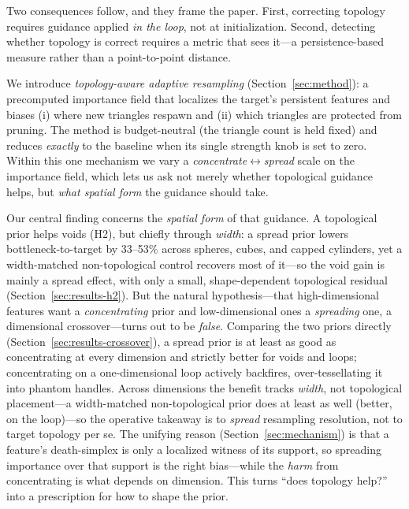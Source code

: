 Two consequences follow, and they frame the paper. First, correcting topology
requires guidance applied \emph{in the loop}, not at initialization. Second,
detecting whether topology is correct requires a metric that sees it---a
persistence-based measure rather than a point-to-point distance.

We introduce \emph{topology-aware adaptive resampling}
(Section~\ref{sec:method}): a precomputed importance field that localizes the
target's persistent features and biases (i) where new triangles respawn and
(ii) which triangles are protected from pruning. The method is budget-neutral
(the triangle count is held fixed) and reduces \emph{exactly} to the baseline
when its single strength knob is set to zero. Within this one mechanism we vary a
\emph{concentrate$\leftrightarrow$spread} scale on the importance field, which
lets us ask not merely whether topological guidance helps, but \emph{what spatial
form} the guidance should take.

Our central finding concerns the \emph{spatial form} of that guidance. A
topological prior helps voids (H2), but chiefly through \emph{width}: a spread prior
lowers bottleneck-to-target by 33--53\% across spheres, cubes, and capped cylinders,
yet a width-matched non-topological control recovers most of it---so the void gain is
mainly a spread effect, with only a small, shape-dependent topological residual
(Section~\ref{sec:results-h2}).
But the natural hypothesis---that high-dimensional features want a
\emph{concentrating} prior and low-dimensional ones a \emph{spreading} one, a
dimensional crossover---turns out to be \emph{false}. Comparing the two priors
directly (Section~\ref{sec:results-crossover}), a spread prior is at least as good
as concentrating at every dimension and strictly better for voids and loops;
concentrating on a one-dimensional loop actively backfires, over-tessellating it
into phantom handles. Across dimensions the benefit tracks \emph{width}, not
topological placement---a width-matched non-topological prior does at least as well
(better, on the loop)---so the operative takeaway is to \emph{spread} resampling
resolution, not to target topology per se. The unifying reason (Section~\ref{sec:mechanism}) is that a
feature's death-simplex is only a localized witness of its support, so spreading
importance over that support is the right bias---while the \emph{harm} from
concentrating is what depends on dimension. This turns ``does topology help?''
into a prescription for how to shape the prior.
